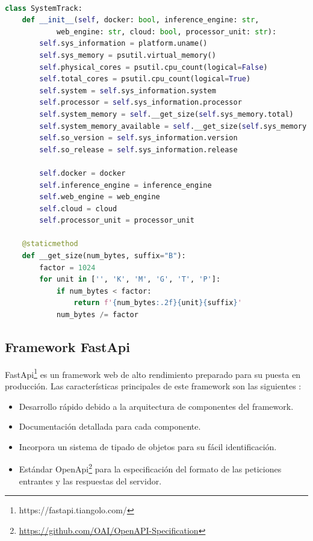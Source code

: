 \begin{lstlisting}[caption=Clase Python para generar información sobre el sistema,
      label=d_label,
      language=Python,label={example4}]

class SystemTrack:
    def __init__(self, docker: bool, inference_engine: str,
            web_engine: str, cloud: bool, processor_unit: str):
        self.sys_information = platform.uname()
        self.sys_memory = psutil.virtual_memory()
        self.physical_cores = psutil.cpu_count(logical=False)
        self.total_cores = psutil.cpu_count(logical=True)
        self.system = self.sys_information.system
        self.processor = self.sys_information.processor
        self.system_memory = self.__get_size(self.sys_memory.total)
        self.system_memory_available = self.__get_size(self.sys_memory.available)
        self.so_version = self.sys_information.version
        self.so_release = self.sys_information.release

        self.docker = docker
        self.inference_engine = inference_engine
        self.web_engine = web_engine
        self.cloud = cloud
        self.processor_unit = processor_unit

    @staticmethod
    def __get_size(num_bytes, suffix="B"):
        factor = 1024
        for unit in ['', 'K', 'M', 'G', 'T', 'P']:
            if num_bytes < factor:
                return f'{num_bytes:.2f}{unit}{suffix}'
            num_bytes /= factor
\end{lstlisting}
\subsection{Framework FastApi}\label{subsec:framework-fastapi}
FastApi\footnote{https://fastapi.tiangolo.com/} es un framework web de alto rendimiento preparado para su puesta en producción.
Las características principales de este framework son las siguientes :

\begin{itemize}
    \item Desarrollo rápido debido a la arquitectura de componentes del framework.
    \item Documentación detallada para cada componente.
    \item Incorpora un sistema de tipado de objetos para su fácil identificación.
    \item Estándar OpenApi\footnote{\url{https://github.com/OAI/OpenAPI-Specification}} para la especificación del formato de las peticiones entrantes y las respuestas del servidor.
\end{itemize}

